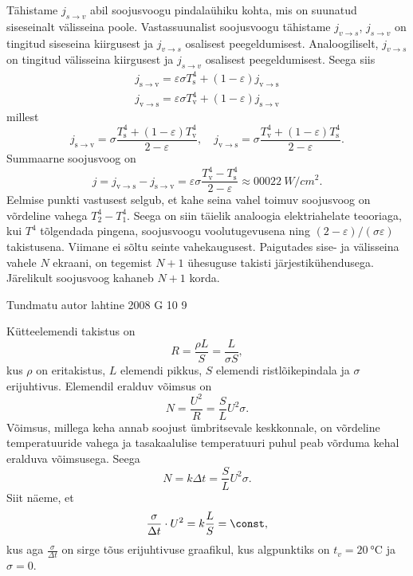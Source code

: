 \documentclass[11pt, twoside]{article}
\begin{document}
{{\ifSolution
\osa Tähistame $j_{s\rightarrow v}$ abil soojusvoogu pindalaühiku kohta, mis on suunatud siseseinalt välisseina poole. Vastassuunalist soojusvoogu tähistame $j_{v\rightarrow s}$, $j_{s\rightarrow v}$ on tingitud siseseina kiirgusest ja $j_{v\rightarrow s}$ osalisest peegeldumisest. Analoogiliselt, $j_{v\rightarrow s}$ on tingitud välisseina kiirgusest ja $j_{s\rightarrow v}$ osalisest peegeldumisest. Seega siis
\[
\begin{aligned}
{j_{\mathrm{s} \rightarrow \mathrm{v}}=\varepsilon \sigma T_{\mathrm{s}}^{4}+(1-\varepsilon) j_{\mathrm{v} \rightarrow \mathrm{s}}} \\ {j_{\mathrm{v} \rightarrow \mathrm{s}}=\varepsilon \sigma T_{\mathrm{v}}^{4}+(1-\varepsilon) j_{\mathrm{s} \rightarrow \mathrm{v}}}
\end{aligned}
\]
millest
\[
j_{\mathrm{s} \rightarrow \mathrm{v}}=\sigma \frac{T_{\mathrm{s}}^{4}+(1-\varepsilon) T_{\mathrm{v}}^{4}}{2-\varepsilon}, \quad j_{\mathrm{v} \rightarrow \mathrm{s}}=\sigma \frac{T_{\mathrm{v}}^{4}+(1-\varepsilon) T_{\mathrm{s}}^{4}}{2-\varepsilon}.
\]
Summaarne soojusvoog on
\[
j=j_{\mathrm{v} \rightarrow \mathrm{s}}-j_{\mathrm{s} \rightarrow \mathrm{v}}=\varepsilon \sigma \frac{T_{\mathrm{v}}^{4}-T_{\mathrm{s}}^{4}}{2-\varepsilon} \approx \SI{00022}{W/cm^2}.
\]
\osa Eelmise punkti vastusest selgub, et kahe seina vahel toimuv soojusvoog on võrdeline vahega $T_{2}^{4}-T_{1}^{4}$. Seega on siin täielik analoogia elektriahelate teooriaga, kui $T^4$ tõlgendada pingena, soojusvoogu voolutugevusena ning $(2-\varepsilon )/(\sigma \varepsilon)$ takistusena. Viimane ei sõltu seinte vahekaugusest. Paigutades sise- ja välisseina vahele $N$ ekraani, on tegemist $N + 1$ ühesuguse takisti järjestikühendusega. Järelikult soojusvoog kahaneb $N + 1$ korda.
\fi
}

{Tundmatu autor} %
{lahtine} %
{2008} %
{G 10} %
{9} %
{

\ifSolution
Kütteelemendi takistus on
\[
R=\frac{\rho L}{S}=\frac{L}{\sigma S},
\]
kus $\rho$ on eritakistus, $L$ elemendi pikkus, $S$ elemendi ristlõikepindala ja $\sigma$ erijuhtivus. Elemendil eralduv võimsus on
\[
N=\frac{U^{2}}{R}=\frac{S}{L} U^{2} \sigma.
\]
Võimsus, millega keha annab soojust ümbritsevale keskkonnale, on võrdeline temperatuuride vahega ja tasakaalulise temperatuuri puhul peab võrduma kehal eralduva võimsusega. Seega
\[
N=k \Delta t=\frac{S}{L} U^{2} \sigma.
\]
Siit näeme, et
\begin{equation} \label{2008-lahg-10:eq1}
\frac{\sigma}{\Delta t} \cdot U^{2}=k \frac{L}{S}=\const,
\end{equation}
kus aga $\frac{\sigma}{\Delta t}$
on sirge tõus erijuhtivuse graafikul, kus algpunktiks on $t_v = \SI{20}{\celsius}$ ja
$\sigma = \num{0}$.

}}
\end{document}
